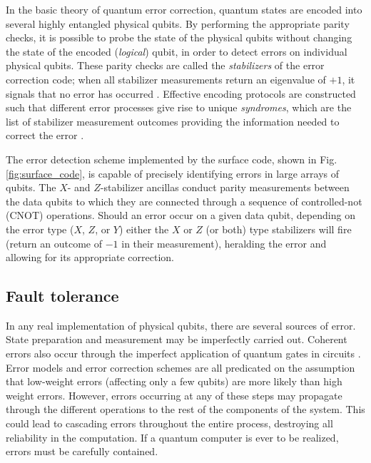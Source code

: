 In the basic theory of quantum error correction, quantum states are encoded into
several highly entangled physical qubits. By performing the appropriate parity
checks, it is possible to probe the state of the physical qubits without
changing the state of the encoded (\textit{logical}) qubit, in order to detect
errors on individual physical qubits. These parity checks are called the
\textit{stabilizers} of the error correction code; when all stabilizer
measurements return an eigenvalue of $+1$, it signals that no error has occurred
\cite{nielsen_chuang_2010}. Effective encoding protocols are constructed such
that different error processes give rise to unique \textit{syndromes}, which
are the list of stabilizer measurement outcomes providing the information
needed to correct the error \cite{fowler12_surfac_codes}.

The error detection scheme implemented by the surface code, shown in Fig.
\ref{fig:surface_code}, is capable of precisely identifying errors in large
arrays of qubits. The $X$- and $Z$-stabilizer ancillas conduct parity
measurements between the data qubits to which they are connected through a
sequence of controlled-not (CNOT) operations. Should an error occur on a given
data qubit, depending on the error type ($X$, $Z$, or $Y$) either the $X$ or $Z$
(or both) type stabilizers will fire (return an outcome of $-1$ in their
measurement), heralding the error and allowing for its appropriate correction.

\subsection{Fault tolerance}
In any real implementation of physical qubits, there are several sources of
error. State preparation and measurement may be imperfectly carried out.
Coherent errors also occur through the imperfect application of quantum gates in
circuits \cite{Devitt_2013}. Error models and error correction schemes are all
predicated on the assumption that low-weight errors (affecting only a few
qubits) are more likely than high weight errors. However, errors occurring at
any of these steps may propagate through the different operations to the rest of
the components of the system. This could lead to cascading errors throughout the
entire process, destroying all reliability in the computation. If a quantum
computer is ever to be realized, errors must be carefully contained.

